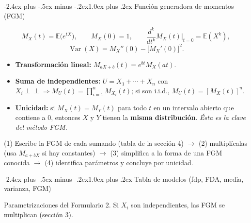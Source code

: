 \documentclass[10pt,a4paper]{article}
\makeatletter
\newcommand{\E}{\mathbb{E}}
\newcommand{\Var}{\operatorname{Var}}
\newcommand{\ind}{\perp\!\!\!\perp}
\renewcommand\section{\@startsection{section}{1}{0pt}%
  {-2.4ex plus -.5ex minus -.2ex}{1.0ex plus .2ex}%
  {\normalfont\large\bfseries\color{seccolor}}}
\makeatother
\begin{document}
\section{Función generadora de momentos (FGM)}

\begin{defbox}[frametitle={Definición y momentos}]
\[
M_X(t)=\E\big(e^{tX}\big),\qquad M_X(0)=1,\qquad
\frac{d^k}{dt^k}M_X(t)\Big|_{t=0}=\E(X^k),
\]
\[
\Var(X)=M_X''(0)-\big[M_X'(0)\big]^2 .
\]
\end{defbox}

\begin{thmbox}[frametitle={Propiedades y unicidad}]
\begin{itemize}
  \item \textbf{Transformación lineal:} $M_{aX+b}(t)=e^{bt}M_X(at)$.
  \item \textbf{Suma de independientes:} $U=X_1+\cdots+X_n$ con
        $X_i\ind\Rightarrow M_U(t)=\prod_{i=1}^n M_{X_i}(t)$; si son i.i.d.,
        $M_U(t)=[M_X(t)]^n$.
  \item \textbf{Unicidad:} si $M_X(t)=M_Y(t)$ para todo $t$ en un intervalo
        abierto que contiene a $0$, entonces $X$ y $Y$ tienen la \textbf{misma
        distribución}. \emph{Ésta es la clave del método FGM.}
\end{itemize}
\end{thmbox}

\begin{notebox}[frametitle={Receta del método FGM}]
(1) Escribe la FGM de cada sumando (tabla de la sección 4)
$\to$ (2) multiplícalas (usa $M_{a+bX}$ si hay constantes)
$\to$ (3) simplifica a la forma de una FGM conocida
$\to$ (4) identifica parámetros y concluye por unicidad.
\end{notebox}

\section{Tabla de modelos (fdp, FDA, media, varianza, FGM)}

Parametrizaciones del Formulario 2. Si $X_i$ son independientes, las FGM se
multiplican (sección 3).
\end{document}

